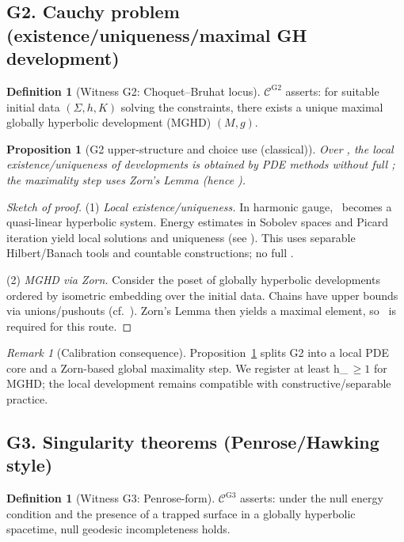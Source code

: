 \documentclass[11pt]{article}
\newtheorem{proposition}[theorem]{Proposition}
\theoremstyle{definition}
\newtheorem{definition}[theorem]{Definition}
\theoremstyle{remark}
\newtheorem{remark}[theorem]{Remark}
\newcommand{\ZF}{\mathsf{ZF}}
\newcommand{\AC}{\mathrm{AC}}
\newcommand{\hChoice}{h_{\mathrm{Choice}}}
\newcommand{\EFE}{\mathrm{EFE}}
\begin{document}
\subsection*{G2. Cauchy problem (existence/uniqueness/maximal GH development)}
\begin{definition}[Witness G2: Choquet--Bruhat locus]
$\mathcal{C}^{\mathrm{G2}}$ asserts: for suitable initial data $(\Sigma,h,K)$ solving the constraints, there exists a unique maximal globally hyperbolic development (MGHD) $(M,g)$.
\end{definition}

\begin{proposition}[G2 upper-structure and choice use (classical)]\label{prop:G2-upper}
Over \ZF, the \emph{local} existence/uniqueness of developments is obtained by PDE methods without full \AC; the \emph{maximality} step uses Zorn's Lemma (hence \AC).
\end{proposition}

\begin{proof}[Sketch of proof]
(1) \emph{Local existence/uniqueness.} In harmonic gauge, \EFE\ becomes a quasi-linear hyperbolic system. Energy estimates in Sobolev spaces and Picard iteration yield local solutions and uniqueness (see \cite[Ch.~VI]{ChoquetBruhat2009}). This uses separable Hilbert/Banach tools and countable constructions; no full \AC.

(2) \emph{MGHD via Zorn.} Consider the poset of globally hyperbolic developments ordered by isometric embedding over the initial data. Chains have upper bounds via unions/pushouts (cf.\ \cite[Thm.~10.1.2]{Wald1984}). Zorn's Lemma then yields a maximal element, so \AC\ is required for this route.
\end{proof}

\begin{remark}[Calibration consequence]
Proposition~\ref{prop:G2-upper} splits G2 into a local PDE core and a Zorn-based global maximality step. We register at least \hChoice$\,\ge 1$ for MGHD; the local development remains compatible with constructive/separable practice.
\end{remark}

\subsection*{G3. Singularity theorems (Penrose/Hawking style)}
\begin{definition}[Witness G3: Penrose-form]
$\mathcal{C}^{\mathrm{G3}}$ asserts: under the null energy condition and the presence of a trapped surface in a globally hyperbolic spacetime, null geodesic incompleteness holds.
\end{definition}
\end{document}
